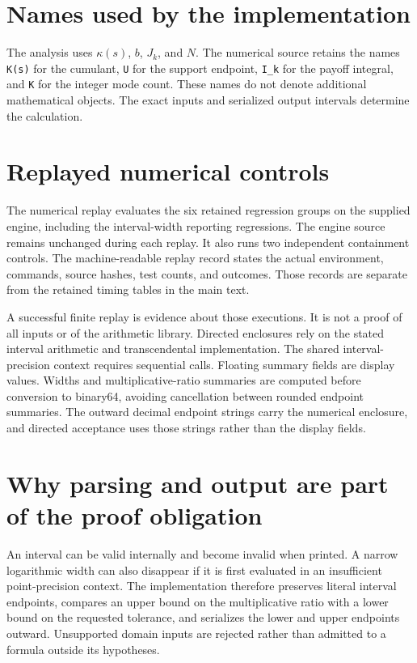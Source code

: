 \section{Names used by the implementation}
The analysis uses $\kappa(s)$, $b$, $J_k$, and $N$. The numerical source retains the names \texttt{K(s)} for the cumulant, \texttt{U} for the support endpoint, \texttt{I\_k} for the payoff integral, and \texttt{K} for the integer mode count. These names do not denote additional mathematical objects. The exact inputs and serialized output intervals determine the calculation.

\section{Replayed numerical controls}\label{app:fresh-validation}
The numerical replay evaluates the six retained regression groups on the
supplied engine, including the interval-width reporting regressions.
The engine source remains unchanged during each replay. It also runs two
independent containment controls. The machine-readable replay record states
the actual environment, commands, source hashes, test counts, and outcomes.
Those records are separate from the retained timing tables in the main text.



A successful finite replay is evidence about those executions. It is not a
proof of all inputs or of the arithmetic library. Directed enclosures rely on
the stated interval arithmetic and transcendental implementation. The shared
interval-precision context requires sequential calls. Floating summary fields
are display values. Widths and multiplicative-ratio summaries are computed
before conversion to binary64, avoiding cancellation between rounded endpoint
summaries. The outward decimal endpoint strings carry the numerical enclosure,
and directed acceptance uses those strings rather than the display fields.

\section{Why parsing and output are part of the proof obligation}
An interval can be valid internally and become invalid when printed. A narrow
logarithmic width can also disappear if it is first evaluated in an
insufficient point-precision context. The implementation therefore preserves
literal interval endpoints, compares an upper bound on the multiplicative
ratio with a lower bound on the requested tolerance, and serializes the lower
and upper endpoints outward. Unsupported domain inputs are rejected rather
than admitted to a formula outside its hypotheses.

